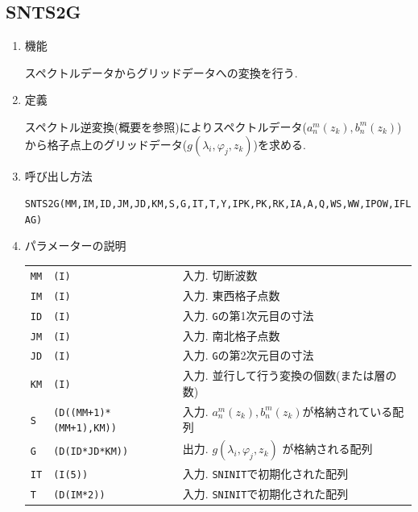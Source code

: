 \documentclass[a4j,fleqn]{jarticle}
\begin{document}

\subsection{SNTS2G}

\begin{enumerate}

\item 機能 

スペクトルデータからグリッドデータへの変換を行う.

\item 定義

スペクトル逆変換(概要を参照)によりスペクトルデータ($a^m_n(z_k),
b^m_n(z_k)$)
から格子点上のグリッドデータ($g(\lambda_i,\varphi_j,z_k)$)を求める.

\item 呼び出し方法 

{\tt SNTS2G(MM,IM,ID,JM,JD,KM,S,G,IT,T,Y,IPK,PK,RK,IA,A,Q,WS,WW,IPOW,IFLAG)}
  
\item パラメーターの説明

\begin{tabular}{lll}
{\tt MM} & {\tt (I)} & 入力. 切断波数\\
{\tt IM} & {\tt (I)} & 入力. 東西格子点数\\
{\tt ID} & {\tt (I)} & 入力. {\tt G}の第1次元目の寸法\\
{\tt JM} & {\tt (I)} & 入力. 南北格子点数\\
{\tt JD} & {\tt (I)} & 入力. {\tt G}の第2次元目の寸法\\
{\tt KM} & {\tt (I)} & 入力. 並行して行う変換の個数(または層の数)\\
{\tt S} & {\tt (D((MM+1)*(MM+1),KM))} 
& 入力. $a^m_n(z_k),b^m_n(z_k)$が格納されている配列\\
{\tt G} & {\tt (D(ID*JD*KM))} & 出力. $g(\lambda_i,\varphi_j,z_k)$
	が格納される配列\\
{\tt IT}  & {\tt (I(5))}    & 入力. {\tt SNINIT}で初期化された配列\\
{\tt T}   & {\tt (D(IM*2))} & 入力. {\tt SNINIT}で初期化された配列\\


\end{tabular}
\end{enumerate}
\end{document}
